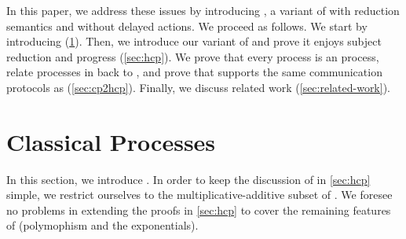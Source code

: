 \documentclass[submission,copyright,creativecommons]{eptcs}
\begin{document}
In this paper, we address these issues by introducing \hcp, a variant of \dhcp with reduction semantics and without delayed actions. We proceed as follows. We start by introducing \cp (\cref{sec:cp}). Then, we introduce our variant of \hcp and prove it enjoys subject reduction and progress (\cref{sec:hcp}). We prove that every \cp process is an \hcp process, relate processes in \hcp back to \cp, and prove that \hcp supports the same communication protocols as \cp (\cref{sec:cp2hcp}). Finally, we discuss related work (\cref{sec:related-work}).

\section{Classical Processes}
\label{sec:cp}

In this section, we introduce \cp. In order to keep the discussion of \hcp in \cref{sec:hcp} simple, we restrict ourselves to the multiplicative-additive subset of \cp. We foresee no problems in extending the proofs in \cref{sec:hcp} to cover the remaining features of \cp (polymophism and the exponentials).
\end{document}
